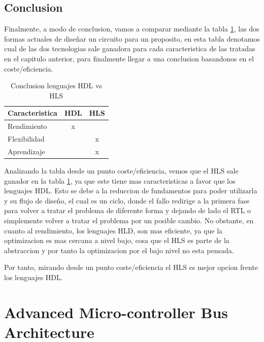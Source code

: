 \documentclass[11pt,spanish,listoffigures,listoftables]{tfgetsinf}
\begin{document}
\section{Conclusion}

   Finalmente, a modo de conclusion, vamos a comparar mediante la tabla
   \ref{tab:hdl_vs_hls}, las dos formas actuales de diseñar un circuito para un
   proposito, en esta tabla denotamos cual de las dos tecnologias sale ganadora
   para cada caracteristica de las tratadas en el capitulo anterior, para
   finalmente llegar a una conclusion basandonos en el coste/eficiencia.

   \begin{table}[h]
      \begin{center}
         \begin{tabular}{|l|c|c|}
            \hline
            Caracteristica & HDL & HLS \\ \hline
            Rendimiento    &  x  &     \\ \hline
            Flexibilidad   &     &  x  \\ \hline
            Aprendizaje    &     &  x  \\
            \hline
         \end{tabular}
         \caption{Conclusion lenguajes HDL vs HLS}
         \label{tab:hdl_vs_hls}
      \end{center}
   \end{table}

   Analizando la tabla desde un punto coste/eficiencia, vemos que el HLS sale
   ganador en la tabla \ref{tab:hdl_vs_hls}, ya que este tiene mas
   caracteristicas a favor que los lenguajes HDL. Esto se debe a la reduccion de
   fundamentos para poder utilizarla y su flujo de dise\~{n}o, el cual es un
   ciclo, donde el fallo redirige a la primera fase para volver a tratar el
   problema de diferente forma y dejando de lado el RTL o simplemente volver a
   tratar el problema por un posible cambio. No obstante, en cuanto al
   rendimiento, los lenguajes HLD, son mas eficiente, ya que la optimizacion es
   mas cercana a nivel bajo, cosa que el HLS es parte de la abstraccion y por
   tanto la optimizacion por el bajo nivel no esta pensada.
   
   Por tanto, mirando desde un punto coste/eficiencia el HLS es mejor opcion
   frente los lenguajes HDL.

\chapter {Advanced Micro-controller Bus Architecture}
\end{document}
